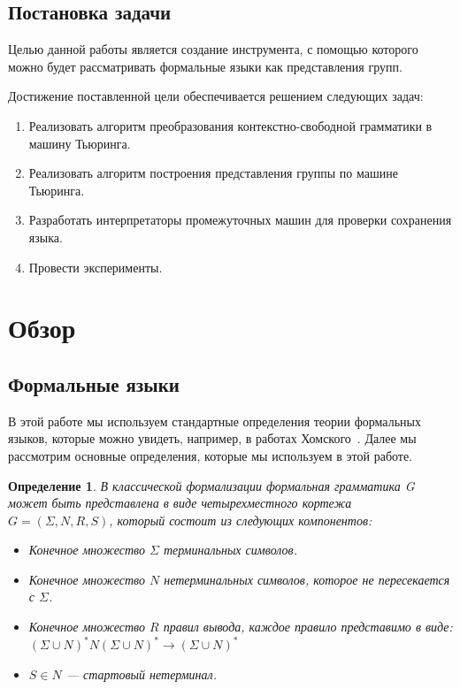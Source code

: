 \documentclass[14pt]{matmex-diploma-custom}
\newtheorem{defn}{Определение}[subsection]
\begin{document}
\subsection*{Постановка задачи}
Целью данной работы является создание инструмента, с помощью которого можно будет 
рассматривать формальные языки как представления групп.

Достижение поставленной цели обеспечивается решением следующих задач:
    \begin{enumerate}
    \item Реализовать алгоритм преобразования контекстно-свободной грамматики в машину Тьюринга.
    \item Реализовать алгоритм построения представления группы по машине Тьюринга.
    \item Разработать интерпретаторы промежуточных машин для проверки сохранения языка.
    \item Провести эксперименты.
\end{enumerate}

\section{Обзор}
\subsection{Формальные языки}
В этой работе мы используем стандартные определения теории формальных языков, которые можно увидеть,
например, в работах Хомского~\cite{chomsky1, chomsky2}. 
Далее мы рассмотрим основные определения, которые мы используем в этой работе. 

\begin{defn}
В классической формализации формальная грамматика G может быть представлена 
в виде четырехместного кортежа $G = (\Sigma, N, R, S)$, который состоит из следующих компонентов:
\begin{itemize}
    \item Конечное множество $\Sigma$ терминальных символов.
    \item Конечное множество $N$ нетерминальных символов, которое не пересекается с $\Sigma$.
    \item Конечное множество $R$ правил вывода, каждое правило представимо в виде: 
    $(\Sigma \cup N)^{*}N(\Sigma \cup N)^{*} \to (\Sigma \cup N)^{*}$
    \item $S \in N$ --- стартовый нетерминал.
\end{itemize}
\end{defn}
\end{document}
